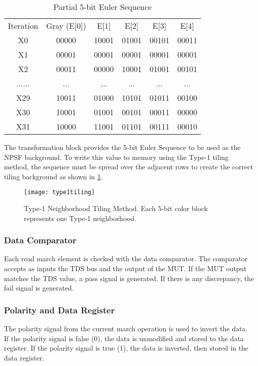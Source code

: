 \begin{table}[h]
  \caption{Partial 5-bit Euler Sequence}
  \centering
  \begin{tabular}{c c c c c c}
  \hline\hline
  Iteration    & Gray (E[0]) & E[1]  & E[2]  & E[3]  & E[4]  \\
  X0  & 00000 & 10001 & 01001 & 00101 & 00011 \\
  X1  & 00001 & 00001 & 00001 & 00001 & 00001 \\
  X2  & 00011 & 00000 & 10001 & 01001 & 00101 \\
  ......             & ...   & ...   & ...   & ...   & ...   \\
  X29 & 10011 & 01000 & 10101 & 01011 & 00100 \\
  X30 & 10001 & 01001 & 00101 & 00011 & 00000 \\
  X31 & 10000 & 11001 & 01101 & 00111 & 00010 \\ [0.5ex]
  \end{tabular}
  \label{tab:euler}
\end{table}

The transformation block provides the 5-bit Euler Sequence to be used as the NPSF background.  To write this value to memory using the Type-1 tiling method, the sequence must be spread over the adjacent rows to create the correct tiling background as shown in \ref{fig:tiling}.  

\begin{figure}[h!]
  \centering
  \texttt{[image: type1tiling]}
  \caption{Type-1 Neighborhood Tiling Method.  Each 5-bit color block represents one Type-1 neighborhood.}
  \label{fig:tiling}
\end{figure}

\subsubsection{Data Comparator}
Each read march element is checked with the data comparator.  The comparator accepts as inputs the TDS bus and the output of the MUT.  If the MUT output matches the TDS value, a pass signal is generated.  If there is any discrepancy, the fail signal is generated.  

\subsubsection{Polarity and Data Register}
The polarity signal from the current march operation is used to invert the data.  If the polarity signal is false (0), the data is unmodified and stored to the data register.  If the polarity signal is true (1), the data is inverted, then stored in the data register.  

